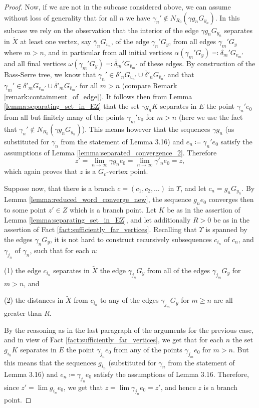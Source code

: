 \documentclass[12pt, a4paper]{article}
\newcommand{\8}{\infty}
\theoremstyle{break}
\theoremstyle{defbreak}
\newcommand{\wtl}[1]{\widetilde{#1}}
\begin{document}
\begin{proof}
    
    Now, if we are not in the subcase considered above,
    we can assume without loss of generality that for all $n$
    we have $\gamma_n'\notin N_{R_0}(\gamma g_n G_{y_n})$.
    In this subcase we rely on the observation that the interior of the edge
    $\gamma g_nG_{y_n}$ separates in $\wtl X$ at least one vertex, say $\bar\gamma_nG_{v_n}$,
    of the edge $\gamma_n'G_y$, from all edges $\gamma_m'G_y$ where $m>n$, and in particular
    from all initial vertices $\alpha(\gamma_m'G_y)\eqqcolon\delta_m'G_{v_m'}$ and all final vertices $\omega(\gamma_m'G_y)\eqqcolon\bar{\delta}_m'G_{\bar{v}_m'}$ of these edges.
    By construction of the Bass-Serre tree, we know that $\gamma_n'\in\delta'_nG_{v_n'}\cup\bar{\delta}'_nG_{\bar{v}_n'}$
    and that $\gamma_m'\in\delta'_mG_{v_m'}\cup\bar{\delta}'_mG_{\bar{v}_m'}$ for all $m>n$ (compare Remark \ref{remark:containment_of_edge}).
    It follows then from Lemma \ref{lemma:separating_set_in_EZ} that the set $\gamma g_n K$ separates in $E$
    the point $\gamma_n'e_0$ from all but finitely many of the points $\gamma_m'e_0$ for $m>n$ (here we use the fact that 
    $\gamma_n'\notin N_{R_0}(\gamma g_nG_{y_n})$).
    This means however that the sequences $\gamma g_n$ (as substituted for $\gamma_n$ from the statement of Lemma 3.16)
    and $e_n\coloneqq\gamma_n'e_0$ satisfy the assumptions of Lemma \ref{lemma:separated_convergence_2}. Therefore
    $$z' = \lim_{n\to\8} \gamma g_n e_0 = \lim_{n\to\8} \gamma'_n e_0 = z,$$
    which again proves that $z$ is a $G_v$-vertex point.

    Suppose now, that there is a branch $c=(c_1,c_2,\dots)$ in 
    $\Upsilon$, and let $c_n =g_n G_{y_n}$. By Lemma \ref{lemma:reduced_word_converge_new}, the sequence $g_n e_0$ converges then to some point $z'\in Z$ which is a branch point. Let $K$ be as in the assertion of Lemma \ref{lemma:separating_set_in_EZ},
    and let additionally $R>0$ be as in the assertion of Fact \ref{fact:sufficiently_far_vertices}. Recalling that $\Upsilon$ is spanned by the edges 
    $\gamma_n G_y$, it is not hard to construct recursively subsequences $c_{i_n}$ of $c_n$, and $\gamma_{j_n}$ of $\gamma_n$, such that for each $n$:
    \item{(1)} the edge $c_{i_n}$ separates in $\wtl{X}$ the edge $\gamma_{j_n}G_y$ from all of the edges $\gamma_{j_m}G_y$ for $m>n$, and
    \item(2) the distances in $\wtl{X}$ from $c_{i_n}$ to any of the edges $\gamma_{j_m}G_y$ for $m\geqslant n$ are all greater than $R$.

    By the reasoning as in the last paragraph of the arguments for the previous case, and in view of Fact \ref{fact:sufficiently_far_vertices}, we get that for each $n$ the set $g_{i_n}K$ separates in $E$ the point $\gamma_{j_n}e_0$ from any of the points $\gamma_{j_m}e_0$ for $m>n$. But this means that the sequences $g_{i_n}$
    (substituted for $\gamma_n$ from the statement of Lemma 3.16)
    and $e_n\coloneqq\gamma_{j_n}e_0$ satisfy the assumptions of Lemma 3.16. Therefore, since $z'=\lim g_{i_n}e_0$, we get that $z=\lim\gamma_{j_n}e_0=z'$, and hence $z$ is a branch point.
\end{proof}
\end{document}
